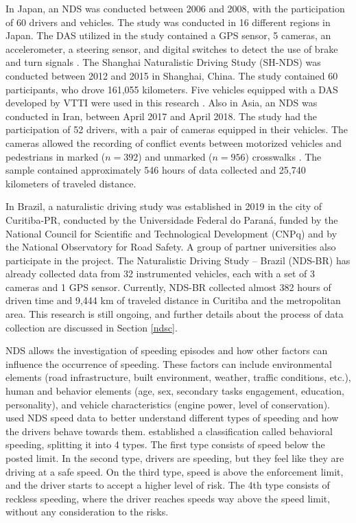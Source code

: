 In Japan, an NDS was conducted between 2006 and 2008, with the participation of 60 drivers and vehicles. The study was conducted in 16 different regions in Japan. The DAS utilized in the study contained a GPS sensor, 5 cameras, an accelerometer, a steering sensor, and digital switches to detect the use of brake and turn signals \cite{Uchida2010}. The Shanghai Naturalistic Driving Study (SH-NDS) was conducted between 2012 and 2015 in Shanghai, China. The study contained 60 participants, who drove 161,055 kilometers. Five vehicles equipped with a DAS developed by VTTI were used in this research \cite{Zhu2018}. Also in Asia, an NDS was conducted in Iran, between April 2017 and April 2018. The study had the participation of 52 drivers, with a pair of cameras equipped in their vehicles. The cameras allowed the recording of conflict events between motorized vehicles and pedestrians in marked ($n = 392$) and unmarked ($n = 956$) crosswalks \cite{Sheykhfard2021}. The sample contained approximately 546 hours of data collected and 25,740 kilometers of traveled distance.

In Brazil, a naturalistic driving study was established in 2019 in the city of Curitiba-PR, conducted by the Universidade Federal do Paraná, funded by the National Council for Scientific and Technological Development (CNPq) and by the National Observatory for Road Safety. A group of partner universities also participate in the project. The Naturalistic Driving Study – Brazil (NDS-BR) has already collected data from 32 instrumented vehicles, each with a set of 3 cameras and 1 GPS sensor. Currently, NDS-BR collected almost 382 hours of driven time and 9,444 km of traveled distance in Curitiba and the metropolitan area. This research is still ongoing, and further details about the process of data collection are discussed in Section \ref{ndsc}.

NDS allows the investigation of speeding episodes and how other factors can influence the occurrence of speeding. These factors can include environmental elements (road infrastructure, built environment, weather, traffic conditions, etc.), human and behavior elements (age, sex, secondary tasks engagement, education, personality),  and vehicle characteristics (engine power, level of conservation). \textcite{Richard2013,Richard2017, Richard2020} used NDS speed data to better understand different types of speeding and how the drivers behave towards them. \textcite{Richard2013} established a classification called behavioral speeding, splitting it into 4 types. The first type consists of speed below the posted limit. In the second type, drivers are speeding, but they feel like they are driving at a safe speed. On the third type, speed is above the enforcement limit, and the driver starts to accept a higher level of risk. The 4th type consists of reckless speeding, where the driver reaches speeds way above the speed limit, without any consideration to the risks. 

